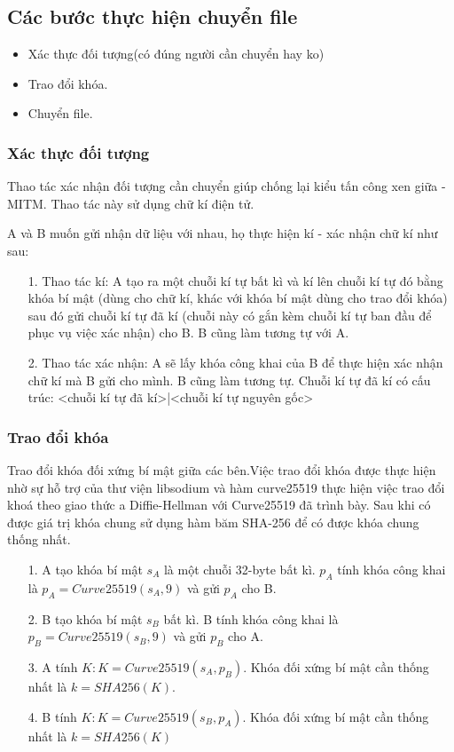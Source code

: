 \documentclass[a4paper,12pt]{report}
\begin{document}
\subsection*{Các bước thực hiện chuyển file}
\begin{itemize}
\item Xác thực đối tượng(có đúng người cần chuyển hay ko)
\item Trao đổi khóa.
\item Chuyển file.
\end{itemize}
\subsubsection*{Xác thực đối tượng}
Thao tác xác nhận đối tượng cần chuyển giúp chống lại kiểu tấn công xen giữa - MITM.
Thao tác này sử dụng chữ kí điện tử.

A và B muốn gửi nhận dữ liệu với nhau, họ thực hiện kí - xác nhận chữ kí như sau:
\begin{itemize}
\item[1. ] Thao tác kí: A tạo ra một chuỗi kí tự bất kì và kí lên chuỗi kí tự đó bằng khóa bí mật (dùng cho chữ kí, khác với khóa bí mật dùng cho trao đổi khóa) sau đó gửi chuỗi kí tự đã kí (chuỗi này có gắn kèm chuỗi kí tự ban đầu để phục vụ việc xác nhận) cho B. B cũng làm tương tự với A.
\item[2. ] Thao tác xác nhận: A sẽ lấy khóa công khai của B để thực hiện xác nhận chữ kí mà B gửi cho mình. B cũng làm tương tự. Chuỗi kí tự đã kí có cấu trúc: <chuỗi kí tự đã kí>|<chuỗi kí tự nguyên gốc>
\end{itemize}
\subsubsection*{Trao đổi khóa}
Trao đổi khóa đối xứng bí mật giữa các bên.Việc trao đổi khóa được thực hiện nhờ sự hỗ trợ của thư viện libsodium và hàm curve25519 thực hiện việc trao đổi khoá theo giao thức a Diffie-Hellman với Curve25519 đã trình bày. Sau khi có được giá trị khóa chung sử dụng hàm băm SHA-256 để có được khóa chung thống nhất.
\begin{itemize}
\item[1. ] A tạo khóa bí mật $s_A$ là một chuỗi 32-byte bất kì. $p_A$ tính khóa công khai là $p_A = Curve25519(s_A, 9)$ và gửi $p_A$ cho B.
\item[2. ] B tạo khóa bí mật $s_B$ bất kì. B tính khóa công khai là $p_B = Curve25519(s_B, 9)$ và gửi $p_B$ cho A.
\item[3. ] A tính $K: K = Curve25519(s_A, p_B)$. Khóa đối xứng bí mật cần thống nhất là $k = SHA256(K)$.
\item[4. ] B tính $K: K = Curve25519(s_B, p_A)$. Khóa đối xứng bí mật cần thống nhất là $k = SHA256(K)$
\end{itemize}
\end{document}
